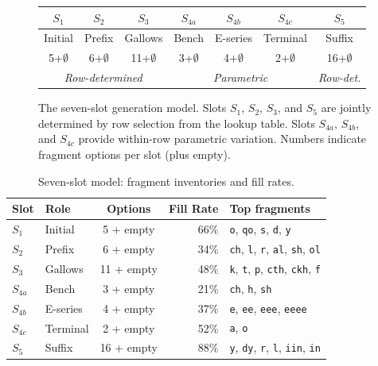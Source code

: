 \documentclass[12pt]{article}
\begin{document}
\begin{figure}[ht]
\centering
\renewcommand{\arraystretch}{1.4}
\begin{tabular}{|c|c|c|c|c|c|c|}
\hline
\textbf{$S_1$} & \textbf{$S_2$} & \textbf{$S_3$} & \textbf{$S_{4a}$} & \textbf{$S_{4b}$} & \textbf{$S_{4c}$} & \textbf{$S_5$} \\
\hline
Initial & Prefix & Gallows & Bench & E-series & Terminal & Suffix \\
\hline
5+$\emptyset$ & 6+$\emptyset$ & 11+$\emptyset$ & 3+$\emptyset$ & 4+$\emptyset$ & 2+$\emptyset$ & 16+$\emptyset$ \\
\hline
\multicolumn{3}{|c|}{\textit{Row-determined}} & \multicolumn{3}{c|}{\textit{Parametric}} & \textit{Row-det.} \\
\hline
\end{tabular}
\caption{The seven-slot generation model. Slots $S_1$, $S_2$, $S_3$, and $S_5$ are jointly determined by row selection from the lookup table. Slots $S_{4a}$, $S_{4b}$, and $S_{4c}$ provide within-row parametric variation. Numbers indicate fragment options per slot (plus empty).}
\label{fig:slotmodel}
\end{figure}

\begin{table}[ht]
\centering
\caption{Seven-slot model: fragment inventories and fill rates.}
\label{tab:slotinventory}
\begin{tabular}{llcrl}
\toprule
Slot & Role & Options & Fill Rate & Top fragments \\
\midrule
$S_1$ & Initial  & 5 + empty & 66\% & \texttt{o}, \texttt{qo}, \texttt{s}, \texttt{d}, \texttt{y} \\
$S_2$ & Prefix   & 6 + empty & 34\% & \texttt{ch}, \texttt{l}, \texttt{r}, \texttt{al}, \texttt{sh}, \texttt{ol} \\
$S_3$ & Gallows  & 11 + empty & 48\% & \texttt{k}, \texttt{t}, \texttt{p}, \texttt{cth}, \texttt{ckh}, \texttt{f} \\
$S_{4a}$ & Bench  & 3 + empty & 21\% & \texttt{ch}, \texttt{h}, \texttt{sh} \\
$S_{4b}$ & E-series & 4 + empty & 37\% & \texttt{e}, \texttt{ee}, \texttt{eee}, \texttt{eeee} \\
$S_{4c}$ & Terminal & 2 + empty & 52\% & \texttt{a}, \texttt{o} \\
$S_5$ & Suffix   & 16 + empty & 88\% & \texttt{y}, \texttt{dy}, \texttt{r}, \texttt{l}, \texttt{iin}, \texttt{in} \\
\bottomrule
\end{tabular}
\end{table}
\end{document}
